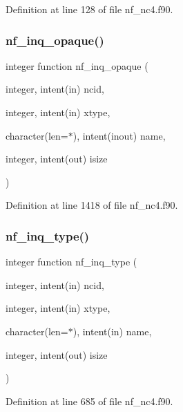 Definition at line 128 of file nf\+\_\+nc4.\+f90.

\mbox{\label{nf__nc4_8f90_ac2dd2b5127fdca24cd688fbaa6c0af3d}} 
\subsubsection{\texorpdfstring{nf\+\_\+inq\+\_\+opaque()}{nf\_inq\_opaque()}}
{\footnotesize\ttfamily integer function nf\+\_\+inq\+\_\+opaque (\begin{DoxyParamCaption}\item[{integer, intent(in)}]{ncid,  }\item[{integer, intent(in)}]{xtype,  }\item[{character(len=$\ast$), intent(inout)}]{name,  }\item[{integer, intent(out)}]{isize }\end{DoxyParamCaption})}



Definition at line 1418 of file nf\+\_\+nc4.\+f90.

\mbox{\label{nf__nc4_8f90_ab1fb0c900f72bfec3ef6b0d285f7347c}} 
\subsubsection{\texorpdfstring{nf\+\_\+inq\+\_\+type()}{nf\_inq\_type()}}
{\footnotesize\ttfamily integer function nf\+\_\+inq\+\_\+type (\begin{DoxyParamCaption}\item[{integer, intent(in)}]{ncid,  }\item[{integer, intent(in)}]{xtype,  }\item[{character(len=$\ast$), intent(in)}]{name,  }\item[{integer, intent(out)}]{isize }\end{DoxyParamCaption})}



Definition at line 685 of file nf\+\_\+nc4.\+f90.

\mbox{\label{nf__nc4_8f90_a14dcc8db40c6cad2186f1a281e222b27}} 
